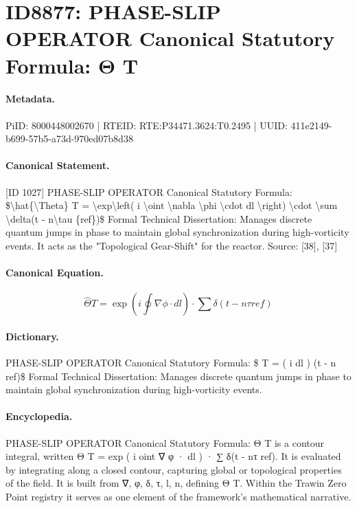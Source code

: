 \section*{ID8877: PHASE-SLIP OPERATOR Canonical Statutory Formula: Θ T}
\paragraph{Metadata.}
PiID: 8000448002670 | RTEID: RTE:P34471.3624:T0.2495 | UUID: 411e2149-b699-57b5-a73d-970ed07b8d38

\paragraph{Canonical Statement.}
[ID 1027] PHASE-SLIP OPERATOR Canonical Statutory Formula: \$\textbackslash{}hat\{\textbackslash{}Theta\} T = \textbackslash{}exp\textbackslash{}left( i \textbackslash{}oint \textbackslash{}nabla \textbackslash{}phi \textbackslash{}cdot dl \textbackslash{}right) \textbackslash{}cdot \textbackslash{}sum \textbackslash{}delta(t - n\textbackslash{}tau \{ref\})\$ Formal Technical Dissertation: Manages discrete quantum jumps in phase to maintain global synchronization during high-vorticity events. It acts as the "Topological Gear-Shift" for the reactor. Source: [38], [37]

\paragraph{Canonical Equation.}
\[
\hat{\Theta} T = \exp\left( i \oint \nabla \phi \cdot dl \right) \cdot \sum \delta(t - n\tau {ref})
\]

\paragraph{Dictionary.}
PHASE-SLIP OPERATOR Canonical Statutory Formula: \$ T = ( i dl ) (t - n ref)\$ Formal Technical Dissertation: Manages discrete quantum jumps in phase to maintain global synchronization during high-vorticity events.

\paragraph{Encyclopedia.}
PHASE-SLIP OPERATOR Canonical Statutory Formula: Θ T is a contour integral, written Θ T = exp ( i oint ∇ φ · dl ) · ∑ δ(t - nτ ref). It is evaluated by integrating along a closed contour, capturing global or topological properties of the field. It is built from ∇, φ, δ, τ, l, n, defining Θ T. Within the Trawin Zero Point registry it serves as one element of the framework's mathematical narrative.

